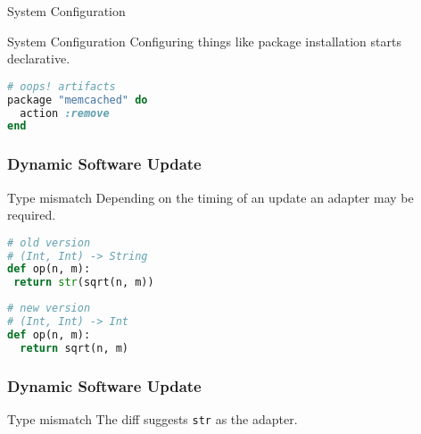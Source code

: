 \documentclass{beamer}
\begin{document}
\begin{frame}[fragile]{System Configuration}
  \begin{block}{System Configuration}
    Configuring things like package installation starts declarative.
  \end{block}

  \begin{example}
    \begin{center}
      \begin{minipage}{.48\textwidth}
        
        \vspace{0.94cm}
      \end{minipage}
      \hfill
      \begin{minipage}{.48\textwidth}
        \begin{lstlisting}[language=ruby]
# oops! artifacts
package "memcached" do
  action :remove
end
        \end{lstlisting}
      \end{minipage}
    \end{center}
  \end{example}
\end{frame}

\begin{frame}[fragile]
  \frametitle{Dynamic Software Update}
  \begin{block}{Type mismatch}
    Depending on the timing of an update an adapter may be required.
  \end{block}

  \begin{example}
    \begin{center}
      \begin{minipage}{.54\textwidth}
        \begin{lstlisting}[language=python]
# old version
# (Int, Int) -> String
def op(n, m):
 return str(sqrt(n, m))
        \end{lstlisting}
      \end{minipage}
      \hfill
      \begin{minipage}{.45\textwidth}
        \begin{lstlisting}[language=python]
# new version
# (Int, Int) -> Int
def op(n, m):
  return sqrt(n, m)
        \end{lstlisting}
      \end{minipage}
    \end{center}
  \end{example}
\end{frame}

\begin{frame}[fragile]
  \frametitle{Dynamic Software Update}
  \begin{block}{Type mismatch}
    The diff suggests \verb|str| as the adapter.
  \end{block}

  \begin{example}
    
  \end{example}
\end{frame}
\end{document}
